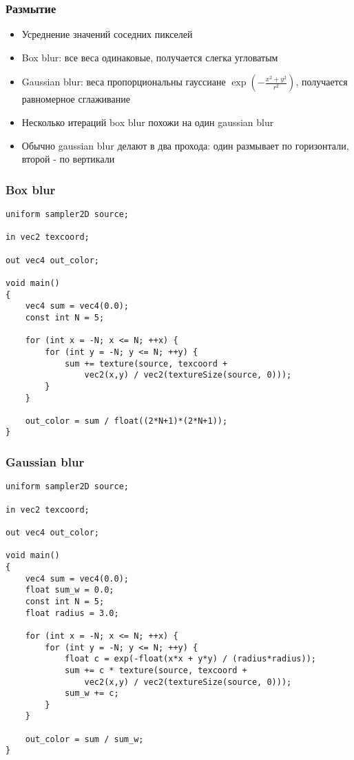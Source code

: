 \documentclass{beamer}
\begin{document}

\begin{frame}[fragile]
\frametitle{Размытие}
\begin{itemize}
\item Усреднение значений соседних пикселей
\pause
\item Box blur: все веса одинаковые, получается слегка угловатым
\pause
\item Gaussian blur: веса пропорциональны гауссиане \begin{math}\exp\left(-\frac{x^2+y^2}{r^2}\right)\end{math}, получается равномерное сглаживание
\pause
\item Несколько итераций box blur похожи на один gaussian blur
\pause
\item Обычно gaussian blur делают в два прохода: один размывает по горизонтали, второй - по вертикали
\end{itemize}
\end{frame}

\begin{frame}[fragile]
\frametitle{Box blur}
\fontsize{10pt}{10pt}
\begin{verbatim}
uniform sampler2D source;

in vec2 texcoord;

out vec4 out_color;

void main()
{
    vec4 sum = vec4(0.0);
    const int N = 5;

    for (int x = -N; x <= N; ++x) {
        for (int y = -N; y <= N; ++y) {
            sum += texture(source, texcoord +
                vec2(x,y) / vec2(textureSize(source, 0)));
        }
    }

    out_color = sum / float((2*N+1)*(2*N+1));
}
\end{verbatim}
\end{frame}

\begin{frame}[fragile]
\frametitle{Gaussian blur}
\fontsize{10pt}{10pt}
\begin{verbatim}
uniform sampler2D source;

in vec2 texcoord;

out vec4 out_color;

void main()
{
    vec4 sum = vec4(0.0);
    float sum_w = 0.0;
    const int N = 5;
    float radius = 3.0;

    for (int x = -N; x <= N; ++x) {
        for (int y = -N; y <= N; ++y) {
            float c = exp(-float(x*x + y*y) / (radius*radius));
            sum += c * texture(source, texcoord +
                vec2(x,y) / vec2(textureSize(source, 0)));
            sum_w += c;
        }
    }

    out_color = sum / sum_w;
}
\end{verbatim}
\end{frame}
\end{document}
